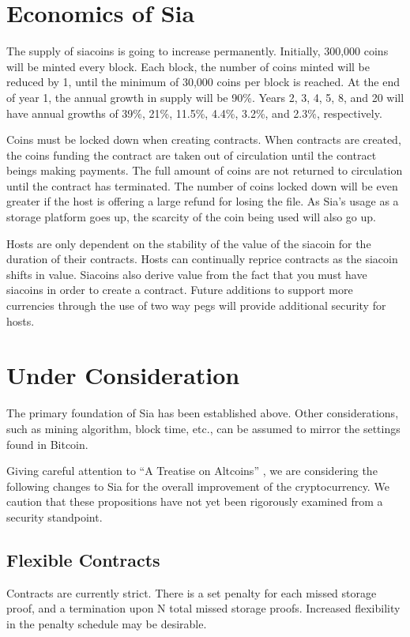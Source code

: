 \documentclass[twocolumn]{article}
\begin{document}
\section{Economics of Sia}
The supply of siacoins is going to increase permanently.
Initially, 300,000 coins will be minted every block.
Each block, the number of coins minted will be reduced by 1, until the minimum of 30,000 coins per block is reached.
At the end of year 1, the annual growth in supply will be 90\%.
Years 2, 3, 4, 5, 8, and 20 will have annual growths of 39\%, 21\%, 11.5\%, 4.4\%, 3.2\%, and 2.3\%, respectively.

Coins must be locked down when creating contracts.
When contracts are created, the coins funding the contract are taken out of circulation until the contract beings making payments.
The full amount of coins are not returned to circulation until the contract has terminated.
The number of coins locked down will be even greater if the host is offering a large refund for losing the file.
As Sia's usage as a storage platform goes up, the scarcity of the coin being used will also go up.

Hosts are only dependent on the stability of the value of the siacoin for the duration of their contracts.
Hosts can continually reprice contracts as the siacoin shifts in value.
Siacoins also derive value from the fact that you must have siacoins in order to create a contract.
Future additions to support more currencies through the use of two way pegs will provide additional security for hosts.

\section{Under Consideration}
The primary foundation of Sia has been established above.
Other considerations, such as mining algorithm, block time, etc., can be assumed to mirror the settings found in Bitcoin.

Giving careful attention to ``A Treatise on Altcoins'' \cite{alts}, we are considering the following changes to Sia for the overall improvement of the cryptocurrency.
We caution that these propositions have not yet been rigorously examined from a security standpoint.

\subsection{Flexible Contracts}
Contracts are currently strict.
There is a set penalty for each missed storage proof, and a termination upon N total missed storage proofs.
Increased flexibility in the penalty schedule may be desirable.
\end{document}
